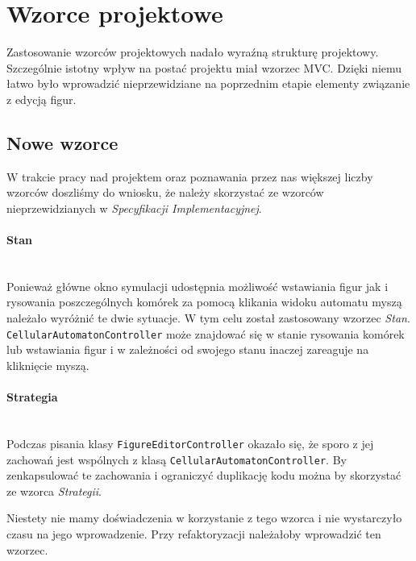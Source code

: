 \documentclass{mwart}
\newcommand{\paragraphnl}[1]{\paragraph{#1} \mbox{} \\}
\begin{document}
\section{Wzorce projektowe}
Zastosowanie wzorców projektowych nadało wyraźną strukturę projektowy. Szczególnie istotny wpływ na postać projektu miał wzorzec MVC. Dzięki niemu łatwo było wprowadzić nieprzewidziane na poprzednim etapie elementy związanie z edycją figur.

\subsection{Nowe wzorce}
W trakcie pracy nad projektem oraz poznawania przez nas większej liczby wzorców doszliśmy do wniosku, że należy skorzystać ze wzorców nieprzewidzianych w \textit{Specyfikacji Implementacyjnej}.

\paragraph{Stan} \mbox{} \\
Ponieważ główne okno symulacji udostępnia możliwość wstawiania figur jak i rysowania poszczególnych komórek za pomocą klikania widoku automatu myszą należało wyróżnić te dwie sytuacje. 
W tym celu został zastosowany wzorzec \textit{Stan}. \texttt{CellularAutomatonController} może znajdować się w stanie rysowania komórek lub wstawiania figur i w zależności od swojego stanu inaczej zareaguje na kliknięcie myszą.

\paragraphnl{Strategia}
Podczas pisania klasy \texttt{FigureEditorController} okazało się, że sporo z jej zachowań jest wspólnych z klasą \texttt{CellularAutomatonController}. By zenkapsulować te zachowania i ograniczyć duplikację kodu można by skorzystać ze wzorca \textit{Strategii}.

Niestety nie mamy doświadczenia w korzystanie z tego wzorca i nie wystarczyło czasu na jego wprowadzenie. Przy refaktoryzacji należałoby wprowadzić ten wzorzec.
\end{document}
